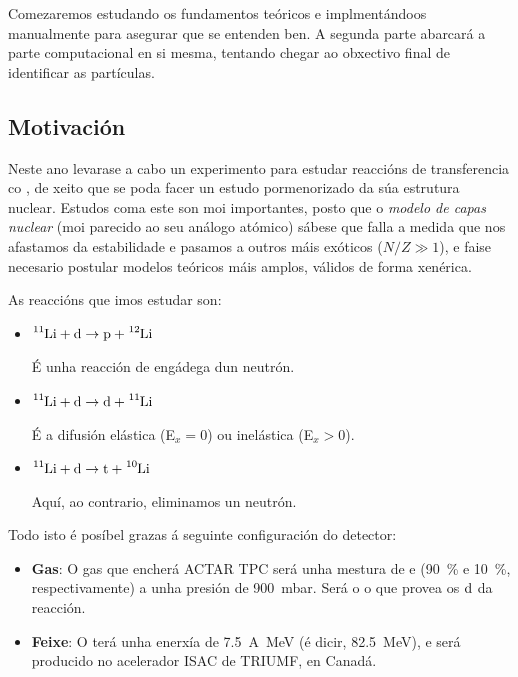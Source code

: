 \documentclass[11pt, a4paper]{article}
\newcommand{\iso}[2]{\ce{^{#1}#2}}
\begin{document}
Comezaremos estudando os fundamentos teóricos e implmentándoos manualmente para asegurar que se entenden ben. A segunda parte abarcará a parte computacional en si mesma, tentando chegar ao obxectivo final de identificar as partículas.

\subsection{Motivación}
Neste ano levarase a cabo un experimento para estudar reaccións de transferencia co \iso{11}{Li}, de xeito que se poda facer un estudo pormenorizado da súa estrutura nuclear. Estudos coma este son moi importantes, posto que o \textit{modelo de capas nuclear} (moi parecido ao seu análogo atómico) sábese que falla a medida que nos afastamos da estabilidade e pasamos a outros máis exóticos ($N / Z \gg 1$), e faise necesario postular modelos teóricos máis amplos, válidos de forma xenérica.

As reaccións que imos estudar son:
\begin{itemize}
    \item $\iso{11}{Li} + \iso{}{d} \rightarrow \iso{}{p} + \iso{12}{Li}$

    É unha reacción de engádega dun neutrón.
    
    \item $\iso{11}{Li} + \iso{}{d} \rightarrow \iso{}{d} + \iso{11}{Li}$

    É a difusión elástica (E$_{x} = 0$) ou inelástica (E$_x > 0$).
    
    \item $\iso{11}{Li} + \iso{}{d} \rightarrow \iso{}{t} + \iso{10}{Li}$

    Aquí, ao contrario, eliminamos un neutrón.
\end{itemize}

Todo isto é posíbel grazas á seguinte configuración do detector:
\begin{itemize}
    \item \textbf{Gas}: O gas que encherá ACTAR TPC será unha mestura de  e  (\qty{90}{\percent} e \qty{10}{\percent}, respectivamente) a unha presión de \qty{900}{\milli\bar}. Será o  o que provea os $\iso{}{d}$ da reacción.
    \item \textbf{Feixe}: O \iso{11}{Li} terá unha enerxía de \qty{7.5}{A\MeV} (é dicir, \qty{82.5}{\MeV}), e será producido no acelerador ISAC de TRIUMF, en Canadá.
\end{itemize}
\end{document}
